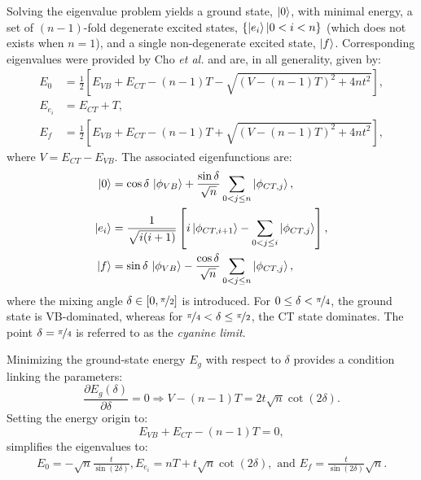 \documentclass[12pt,a4paper]{article}
\begin{document}
Solving the eigenvalue problem yields a ground state, $\ket{0}$, with minimal energy, a set of $(n-1)$-fold degenerate excited states, $\{\ket{e_i} | 0<i< n\}$ (which does not exists when $n=1$), and a single non-degenerate excited state, $\ket{f}$.
Corresponding eigenvalues were provided by Cho \emph{et al.} \cite{choNonlinearOpticalProperties2002} and are, in all generality, given by:
\begin{align}
	E_{0} &= \frac{1}{2} \left[E_{VB} + E_{CT} - (n-1)T - \sqrt{(V - (n-1)T)^2 + 4nt^2}\right], \nonumber\\
	E_{e_i} &= E_{CT} + T, \nonumber\\
	E_{f} &= \frac{1}{2} \left[E_{VB} + E_{CT} - (n-1)T + \sqrt{(V - (n-1)T)^2 + 4nt^2}\right],
\end{align}
where $V = E_{CT} - E_{VB}$. 
The associated eigenfunctions are:
\begin{align}
	\ket{0} &= \cos\delta\,\ket{\phi_{VB}} + \frac{\sin\delta}{\sqrt{n}} \sum_{0<j\leq n} \ket{\phi_{CT,j}},\nonumber\\
	\ket{e_i} &= \frac{1}{\sqrt{i(i+1)}}\left[i \ket{\phi_{CT,i+1}} - \sum_{0<j\leq i} \ket{\phi_{CT,j}}\right],\nonumber\\
	\ket{f} &= \sin\delta\,\ket{\phi_{VB}} - \frac{\cos\delta}{\sqrt{n}} \sum_{0<j\leq n} \ket{\phi_{CT,j}},
\end{align}
where the mixing angle $\delta \in [0, \nicefrac{\pi}{2}]$ is introduced. For $0 \leq \delta < \nicefrac{\pi}{4}$, the ground state is VB-dominated, whereas for $\nicefrac{\pi}{4} < \delta \leq \nicefrac{\pi}{2}$, the CT state dominates. The point $\delta = \nicefrac{\pi}{4}$ is referred to as the \textit{cyanine limit}.

Minimizing the ground-state energy $E_g$ with respect to $\delta$ provides a condition linking the parameters:
\begin{equation}
	\frac{\partial E_g(\delta)}{\partial \delta} = 0 \Rightarrow V - (n-1)T = 2t \sqrt{n} \cot(2\delta). \label{eq:cot}
\end{equation}
Setting the energy origin to:
\begin{equation}
	E_{VB} + E_{CT} - (n-1)T = 0, \label{eq:eorig}
\end{equation}
simplifies the eigenvalues to:
\begin{align}
	E_{0} = -\sqrt{n} \frac{t}{\sin(2\delta)}, E_{e_i} = nT + t \sqrt{n} \cot(2\delta), \text{ and }
	E_{f} =  \frac{t}{\sin(2\delta)}\sqrt{n}.\label{eq:energies}
\end{align}
\end{document}
